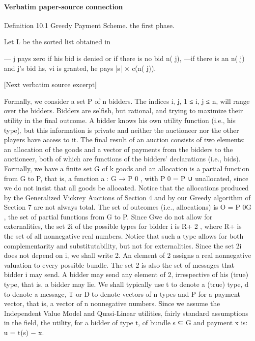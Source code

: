 \documentclass[10pt]{article}
\begin{document}
\paragraph{Verbatim paper-source connection}
\begin{ReviewVerbatim}
Definition 10.1 Greedy Payment Scheme.
the first phase.

Let L be the sorted list obtained in

— j pays zero if his bid is denied or if there is no bid n( j),
—if there is an n( j) and j’s bid hs, vi is granted, he pays |s| × c(n( j)).

[Next verbatim source excerpt]

Formally, we consider a set P of n bidders. The indices i, j, 1 ≤ i, j ≤ n, will
range over the bidders. Bidders are selfish, but rational, and trying to maximize their
utility in the final outcome. A bidder knows his own utility function (i.e., his type),
but this information is private and neither the auctioneer nor the other players have
access to it. The final result of an auction consists of two elements: an allocation
of the goods and a vector of payments from the bidders to the auctioneer, both of
which are functions of the bidders’ declarations (i.e., bids). Formally, we have a
finite set G of k goods and an allocation is a partial function from G to P, that is, a
function a : G → P 0 , with P 0 = P ∪ {unallocated}, since we do not insist that all
goods be allocated. Notice that the allocations produced by the Generalized Vickrey
Auctions of Section 4 and by our Greedy algorithm of Section 7 are not always
total. The set of outcomes (i.e., allocations) is O = P 0G , the set of partial functions
from G to P. Since Gwe do not allow for externalities, the set 2i of the possible types
for bidder i is R+ 2 , where R+ is the set of all nonnegative real numbers. Notice
that such a type allows for both complementarity and substitutability, but not for
externalities. Since the set 2i does not depend on i, we shall write 2. An element
of 2 assigns a real nonnegative valuation to every possible bundle. The set 2 is
also the set of messages that bidder i may send. A bidder may send any element of
2, irrespective of his (true) type, that is, a bidder may lie. We shall typically use t
to denote a (true) type, d to denote a message, T or D to denote vectors of n types
and P for a payment vector, that is, a vector of n nonnegative numbers.
Since we assume the Independent Value Model and Quasi-Linear utilities, fairly
standard assumptions in the field, the utility, for a bidder of type t, of bundle s ⊆ G
and payment x is:
u = t(s) − x.


\end{ReviewVerbatim}
\end{document}
